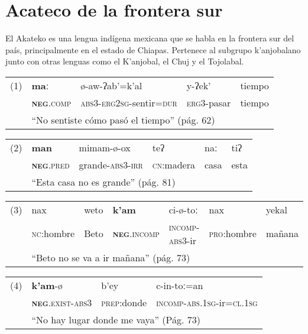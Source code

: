 \section*{Acateco de la frontera sur}

\noindent El Akateko es una lengua indígena mexicana que se habla en la frontera sur del país, principalmente en el estado de Chiapas. Pertenece al subgrupo k'anjobalano junto con otras lenguas como el K'anjobal, el Chuj y el Tojolabal. \vspace{0.3cm}


{\noindent \setmainfont{Charis SIL}
\begin{tabular}{lllll}
(1) & \textbf{maː} & ø-aw-ʔab'=k'al & y-ʔek' & tiempo \\
& \textsc{\textbf{neg}.comp} & \textsc{abs3-erg2sg}-sentir\textsc{=dur} & \textsc{erg3}-pasar & tiempo \\
& \multicolumn{4}{l}{“No sentiste cómo pasó el tiempo” (pág. 62)}
\end{tabular} \vspace{0.25cm}

\noindent \begin{tabular}{llllll}
(2) & \textbf{man} & mimam-ø-ox & teʔ & naː & tiʔ \\
 & \textsc{\textbf{neg}.pred} & grande-\textsc{abs3-irr} & \textsc{cn}:madera & casa & esta \\
 & \multicolumn{5}{l}{“Esta casa no es grande” (pág. 81)}
\end{tabular} \vspace{0.25cm}

\noindent \begin{tabular}{lllllll}
(3) & nax & weto & \textbf{k'am} & ci-ø-toː & nax & yekal \\
& \textsc{nc}:hombre & Beto & \textsc{\textbf{neg}.incomp} & \textsc{incomp-abs3}-ir & \textsc{pro}:hombre & mañana \\
& \multicolumn{6}{l}{“Beto no se va a ir mañana” (pág. 73)}                         
\end{tabular} \vspace{0.25cm}

\noindent \begin{tabular}{llll}
(4) & \textbf{k'am}-ø & b'ey & c-in-toː=an \\
& \textsc{\textbf{neg}.exist-abs3} & \textsc{prep}:donde & \textsc{incomp-abs.1sg}-ir=\textsc{cl.1sg} \\
& \multicolumn{3}{l}{“No hay lugar donde me vaya” (Pág. 73)}  
\end{tabular} \vspace{0.25cm}

}
